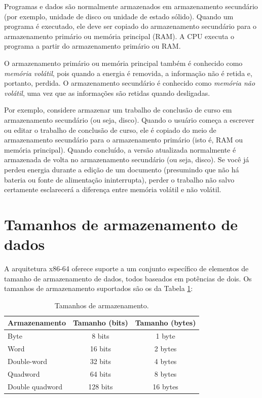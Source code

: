 Programas e dados são normalmente armazenados em armazenamento secundário (por exemplo, unidade de disco ou unidade de estado sólido). Quando um programa é executado, ele deve ser copiado do armazenamento secundário para o armazenamento primário ou memória principal (RAM). A CPU executa o programa a partir do armazenamento primário ou RAM.

O armazenamento primário ou memória principal também é conhecido como \textit{memória volátil}, pois quando a energia é removida, a informação não é retida e, portanto, perdida. O armazenamento secundário é conhecido como \textit{memória não volátil}, uma vez que as informações são retidas quando desligadas.

Por exemplo, considere armazenar um trabalho de conclusão de curso em armazenamento secundário (ou seja, disco). Quando o usuário começa a escrever ou editar o trabalho de conclusão de curso, ele é copiado do meio de armazenamento secundário para o armazenamento primário (isto é, RAM ou memória principal). Quando concluído, a versão atualizada normalmente é armazenada de volta no armazenamento secundário (ou seja, disco). Se você já perdeu energia durante a edição de um documento (presumindo que não há bateria ou fonte de alimentação ininterrupta), perder o trabalho não salvo certamente esclarecerá a diferença entre memória volátil e não volátil.

\section{Tamanhos de armazenamento de dados}
A arquitetura x86-64 oferece suporte a um conjunto específico de elementos de tamanho de armazenamento de dados, todos baseados em potências de dois. Os tamanhos de armazenamento suportados são os da Tabela \ref{tab:tamanhosdearmazenamento}:

\begin{table}[h]
	\centering
	\begin{tabular}{|l|c|c|}
		\hline
		\rowcolor[HTML]{C0C0C0} 
		{\color[HTML]{000000} } Armazenamento & {\color[HTML]{000000} Tamanho (bits)} & {\color[HTML]{000000} Tamanho (bytes)} \\ \hline
		Byte& 8 bits & 1 byte\\ \hline
		Word & 16 bits & 2 bytes\\ \hline
		Double-word & 32 bits & 4 bytes\\ \hline
		Quadword & 64 bits & 8 bytes\\ \hline
		Double quadword & 128 bits & 16 bytes  \\ \hline
	\end{tabular}
	\caption{Tamanhos de armazenamento.}
	\label{tab:tamanhosdearmazenamento}
\end{table}

